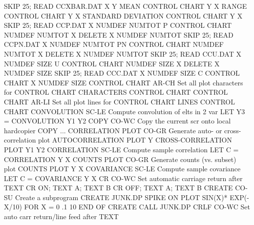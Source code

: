                                   SKIP 25; READ CCXBAR.DAT X Y
                                  MEAN CONTROL CHART Y X
                                  RANGE CONTROL CHART Y X
                                  STANDARD DEVIATION CONTROL CHART Y X
                                  SKIP 25; READ CCP.DAT X NUMDEF NUMTOT
                                  P CONTROL CHART NUMDEF NUMTOT X
                                  DELETE X NUMDEF NUMTOT
                                  SKIP 25; READ CCPN.DAT X NUMDEF NUMTOT
                                  PN CONTROL CHART NUMDEF NUMTOT X
                                  DELETE X NUMDEF NUMTOT
                                  SKIP 25; READ CCU.DAT X NUMDEF SIZE
                                  U CONTROL CHART NUMDEF SIZE X
                                  DELETE X NUMDEF SIZE
                                  SKIP 25; READ CCC.DAT X NUMDEF SIZE
                                  C CONTROL CHART X NUMDEF SIZE
CONTROL CHART               AR-CH Set all plot characters for CONTROL CHART
                                  CHARACTERS CONTROL CHART
CONTROL CHART               AR-LI Set all plot lines for CONTROL CHART
                                  LINES CONTROL CHART
CONVOLUTION                 SC-LE Compute convolution of elts in 2 var
                                  LET Y3 = CONVOLUTION Y1 Y2
COPY                        CO-WC Copy the current scr onto local hardcopier
                                  COPY
... CORRELATION PLOT        CO-GR Generate auto- or cross-correlation plot
                                  AUTOCORRELATION PLOT Y
                                  CROSS-CORRELATION PLOT Y1 Y2
CORRELATION                 SC-LE Compute sample correlation
                                  LET C = CORRELATION Y X
COUNTS PLOT                 CO-GR Generate counts (vs. subset) plot
                                  COUNTS PLOT Y X
COVARIANCE                  SC-LE Compute sample covariance
                                  LET C = COVARIANCE Y X
CR                          CO-WC Set automatic carriage return after TEXT
                                  CR ON; TEXT A; TEXT B
                                  CR OFF; TEXT A; TEXT B
CREATE                      CO-SU Create a subprogram
                                  CREATE JUNK.DP
                                  SPIKE ON
                                  PLOT SIN(X)* EXP(-X/10) FOR X = 0 .1 10
                                  END OF CREATE
                                  CALL JUNK.DP
CRLF                        CO-WC Set auto carr return/line feed after TEXT
